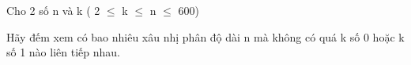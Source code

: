 Cho 2 số n và k ( 2 $\le$ k  $\le$  n  $\le$  600)  

   Hãy đếm xem có bao nhiêu xâu nhị phân độ dài n mà không có quá k số 0 hoặc k số 1 nào liên tiếp nhau.  

\